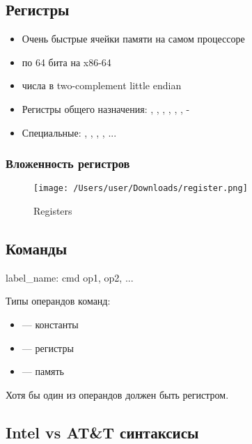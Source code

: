   \subsection{Регистры}
    \begin{itemize}
      \item Очень быстрые ячейки памяти на самом процессоре
      \item по 64 бита на x86-64
      \item числа в two-complement little endian
      \item Регистры общего назначения: , , , , , , -
      \item Специальные: , , , , ...
    \end{itemize}
  
  \subsubsection{Вложенность регистров}
\begin{figure}[H]
  \centering
  \texttt{[image: /Users/user/Downloads/register.png]}
  \caption{Registers}
  \label{fig:registers}
\end{figure}

  \subsection{Команды}
    \begin{asmminted}
label_name:
  cmd op1, op2, ...  
    \end{asmminted}
    
    Типы операндов команд:
    \begin{itemize}
      \item {} — константы
      \item {} — регистры
      \item {} — память
    \end{itemize}
    Хотя бы один из операндов должен быть регистром.
  
  \subsection{Intel vs AT\&T синтаксисы}
  
